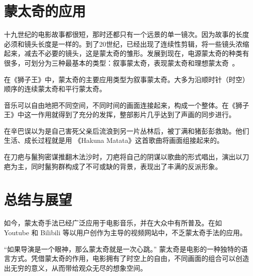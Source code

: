 \documentclass[final]{cvpr}
\begin{document}
\section{蒙太奇的应用}\label{sec:HC}

十九世纪的电影故事都很短，那时还都只有一个远景的单一镜次。因为故事的长度必须和镜头长度是一样的。到了20世纪，已经出现了连续性剪辑，将一些镜头浓缩起来，减去不必要的镜头，这是蒙太奇的雏形。发展到现在，电源蒙太奇的种类有很多，可划分为三种最基本的类型：叙事蒙太奇，表现蒙太奇和理想蒙太奇~\cite{zhihu0}。

在《狮子王》中，蒙太奇的主要应用类型为叙事蒙太奇。大多为沿顺时针（时空）顺序的连续蒙太奇和平行蒙太奇。

音乐可以自由地把不同空间，不同时间的画面连接起来，构成一个整体。在《狮子王》中这一作用就得到了充分的发挥，整部影片几乎达到了声画的同步进行。

在辛巴误以为是自己害死父亲后流浪到另一片丛林后，被丁满和猪彭彭救助。他们生活、成长过程就是用 《Hakuna Matata》这首歌曲将画面组接起来的。

在刀疤与鬣狗密谋推翻木法沙时，刀疤将自己的阴谋以歌曲的形式唱出，演出以刀疤为主，同时鬣狗群构成了不可或缺的背景，表现出了丰满的反派形象。


\section{总结与展望}\label{sec:Conclusion}

如今，蒙太奇手法已经广泛应用于电影音乐，并在大众中有所普及。在如 Youtube 和 Bilibili 等以用户创作为主导的视频网站中，不乏蒙太奇手法的应用。

“如果导演是一个眼神，那么蒙太奇就是一次心跳。” 蒙太奇是电影的一种独特的语言方式。凭借蒙太奇的作用，电影拥有了时空上的自由，不同画面的组合可以创造出无穷的意义，从而带给观众无尽的想象空间。

{\small


}

\end{document}
